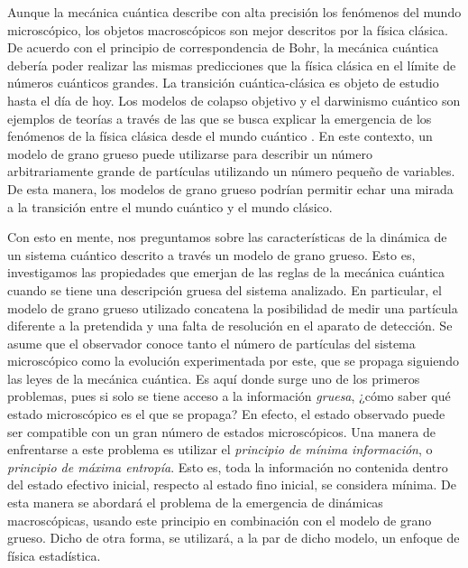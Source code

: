 Aunque la mecánica cuántica describe con alta precisión los fenómenos del mundo microscópico, los objetos macroscópicos son mejor descritos por la física clásica. De acuerdo con el principio de correspondencia de Bohr, la mecánica cuántica debería poder realizar las mismas predicciones que la física clásica en el límite de números cuánticos grandes. La transición cuántica-clásica es objeto de estudio hasta el día de hoy. Los modelos de colapso objetivo y el darwinismo cuántico son ejemplos de teorías a través de las que se busca explicar la emergencia de los fenómenos de la física clásica desde el mundo cuántico \cite{Zurek, Bassi}. En este contexto, un modelo de grano grueso puede utilizarse para describir un número arbitrariamente grande de partículas utilizando un número pequeño de variables. De esta manera, los modelos de grano grueso podrían permitir echar una mirada a la transición entre el mundo cuántico y el mundo clásico.



Con esto en mente, nos preguntamos sobre las características de la dinámica de un sistema cuántico descrito a través un modelo de grano grueso. Esto es, investigamos las propiedades que emerjan de las reglas de la mecánica cuántica cuando se tiene una descripción gruesa del sistema analizado. En particular, el modelo de grano grueso utilizado concatena la posibilidad de medir una partícula diferente a la pretendida y una falta de resolución en el aparato de detección. Se asume que el observador conoce tanto el número de partículas del sistema microscópico como la evolución experimentada por este, que se propaga siguiendo las leyes de la mecánica cuántica. Es aquí donde surge uno de los primeros problemas, pues si solo se tiene acceso a la información \textit{gruesa}, ¿cómo saber qué estado microscópico es el que se propaga? En efecto, el estado observado puede ser compatible con un gran número de estados microscópicos. Una manera de enfrentarse a este problema es utilizar el \textit{principio de mínima información}, o \textit{principio de máxima entropía}. Esto es, toda la información no contenida dentro del estado efectivo inicial, respecto al estado fino inicial, se considera mínima. De esta manera se abordará el problema de la emergencia de dinámicas macroscópicas, usando este principio \cite{JaynesI,Brillouin} en combinación con el modelo de grano grueso. Dicho de otra forma, se utilizará, a la par de dicho modelo, un enfoque de física estadística. %


